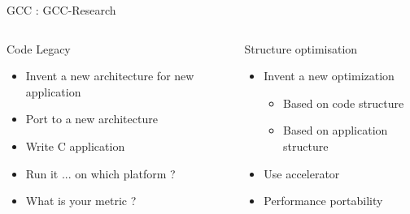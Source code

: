 \begin{Frame}{GCC : GCC-Research}
 \begin{columns}[t]
  \begin{column}{\BW}
    \begin{block}{Code Legacy}
      \begin{itemize}
        \item Invent a new architecture for new application
        \item Port to a new architecture
        \item Write C application
        \item Run it ... on which platform ?
        \item What is your metric ?
      \end{itemize}
    \end{block}
  \end{column}
  \begin{column}{\BW}
    \begin{block}{Structure optimisation}
      \begin{itemize}
      \item Invent a new optimization
        \begin{itemize}
        \item Based on code structure
        \item Based on application structure
        \end{itemize}
      \item Use accelerator
      \item Performance portability
      \end{itemize}
    \end{block}
  \end{column}
 \end{columns}
\end{Frame}
